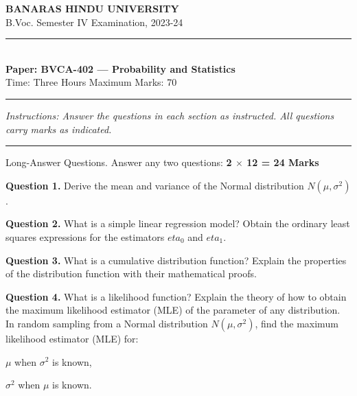 \documentclass[11pt,a4paper]{article}
\begin{document}
\begin{center}
  {\large\bfseries BANARAS HINDU UNIVERSITY}\\[2pt]
  {\normalsize B.Voc. Semester IV Examination, 2023-24}\\[6pt]
  \rule{0.8\linewidth}{0.5pt}\\[6pt]
  {\large\bfseries Paper: BVCA-402 --- Probability and Statistics}\\[4pt]
  {\normalsize Time: Three Hours \hfill Maximum Marks: 70}
\end{center}

\rule{\linewidth}{0.4pt}

\smallskip



\noindent   \textit{Instructions: Answer the questions in each section as instructed. All questions carry marks as indicated.}

\bigskip




\rule{\linewidth}{0.4pt}\smallskip

Long-Answer Questions. Answer any two questions: \hfill   \textbf{2 $ \times$ 12 = 24 Marks}

\medskip



\noindent   \textbf{Question 1.} Derive the mean and variance of the Normal distribution $N(\mu, \sigma^2)$.

\medskip



\noindent   \textbf{Question 2.} What is a simple linear regression model? Obtain the ordinary least squares expressions for the estimators $eta_0$ and $eta_1$.

\medskip



\noindent   \textbf{Question 3.} What is a cumulative distribution function? Explain the properties of the distribution function with their mathematical proofs.

\medskip



\noindent   \textbf{Question 4.} What is a likelihood function? Explain the theory of how to obtain the maximum likelihood estimator (MLE) of the parameter of any distribution. In random sampling from a Normal distribution $N(\mu, \sigma^2)$, find the maximum likelihood estimator (MLE) for:

\begin{parts}
  \item $\mu$ when $\sigma^2$ is known,
  \item $\sigma^2$ when $\mu$ is known.
\end{parts}
\end{document}
